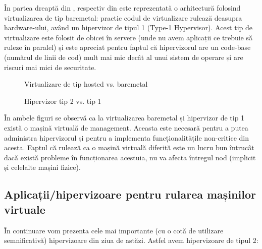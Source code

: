 În partea dreaptă din
, respectiv din
 este reprezentată o arhitectură
folosind virtualizarea de tip baremetal: practic codul de virtualizare rulează
deasupra hardware-ului, având un hipervizor de tipul 1 (Type-1 Hypervisor).
Acest tip de virtualizare este folosit de obicei în servere (unde nu avem
aplicații ce trebuie să ruleze în paralel) și este apreciat pentru faptul că hipervizorul are
un code-base (numărul de linii de cod) mult mai mic decât al unui sistem de
operare și are riscuri mai mici de securitate.

\begin{figure}[htbp]
	\centering
	\def\svgwidth{\columnwidth}
	
	\caption{Virtualizare de tip hosted vs. baremetal}
	\label{fig:vm:hosted-baremetal}
\end{figure}

\begin{figure}[htbp]
	\centering
	\def\svgwidth{\columnwidth}
	
	\caption{Hipervizor tip 2 vs. tip 1}
	\label{fig:vm:hypervisor-types}
\end{figure}

În ambele figuri se observă ca la virtualizarea baremetal și hipervizor de tip 1
există o mașină virtuală de management. Aceasta este necesară pentru a putea
administra hipervizorul și pentru a implementa funcționalitățile non-critice din
acesta. Faptul că rulează ca o mașină virtuală diferită este un lucru bun
întrucât dacă există probleme în funcționarea acestuia, nu va afecta întregul
nod (implicit și celelalte mașini fizice).

\subsection{Aplicații/hipervizoare pentru rularea mașinilor virtuale}
\label{sec:vm:concepts:apps}

În continuare vom prezenta cele mai importante (cu o cotă de utilizare
semnificativă) hipervizoare din ziua de astăzi. Astfel avem hipervizoare de
tipul 2:


